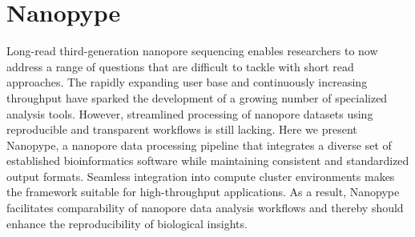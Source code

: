 \chapter{Nanopype}

Long-read third-generation nanopore sequencing enables researchers to now address a range of questions that are difficult to tackle with short read approaches. The rapidly expanding user base and continuously increasing throughput have sparked the development of a growing number of specialized analysis tools. However, streamlined processing of nanopore datasets using reproducible and transparent workflows is still lacking. Here we present Nanopype, a nanopore data processing pipeline that integrates a diverse set of established bioinformatics software while maintaining consistent and standardized output formats. Seamless integration into compute cluster environments makes the framework suitable for high-throughput applications. As a result, Nanopype facilitates comparability of nanopore data analysis workflows and thereby should enhance the reproducibility of biological insights.

